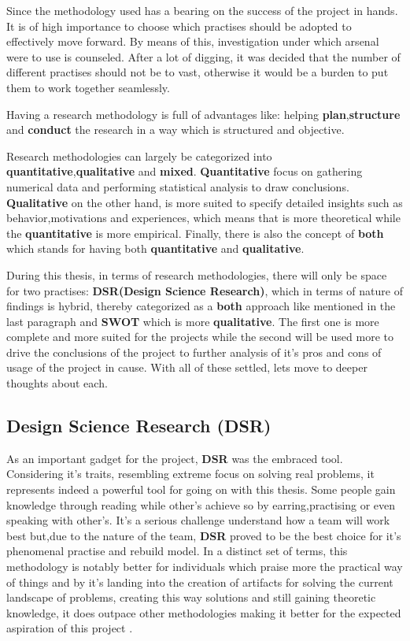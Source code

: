 Since the methodology used has a bearing on the success of the project in hands. It is of high importance to choose which
practises should be adopted to effectively move forward. By means of this, investigation under which arsenal were to use is
counseled. After a lot of digging, it was decided that the number of different practises should not be to vast, otherwise it 
would be a burden to put them to work together seamlessly. 

Having a research methodology is full of advantages like: helping \textbf{plan},\textbf{structure} and \textbf{conduct} 
the research in a way which is structured and objective. 

Research methodologies can largely be categorized into \textbf{quantitative},\textbf{qualitative} and \textbf{mixed}. 
\textbf{Quantitative} focus on gathering numerical data and performing statistical analysis to draw conclusions. \textbf{Qualitative} 
on the other hand, is more suited to specify detailed insights such as behavior,motivations and experiences, which means that is more 
theoretical while the \textbf{quantitative} is more empirical. Finally, there is also the concept of \textbf{both} which stands for having 
both \textbf{quantitative} and \textbf{qualitative}.

During this thesis, in terms of research methodologies, there will only be space for two practises:  \textbf{DSR(Design Science Research)}, 
which in terms of nature of findings is hybrid, thereby categorized as a \textbf{both} approach like mentioned in the last paragraph and 
\textbf{SWOT} which is more \textbf{qualitative}. The first one is more complete and more suited for the projects while the second will 
be used more to drive the conclusions of the project to further analysis of it's pros and cons of usage of the project in cause. With 
all of these settled, lets move to deeper thoughts about each.

%
%
%
%
\subsection{Design Science Research (DSR)}
As an important gadget for the project, \textbf{DSR}  was the embraced tool. Considering it's traits, resembling extreme focus
on solving real problems, it represents indeed a powerful tool for going on with this thesis. Some people gain knowledge through
reading while other's achieve so by earring,practising or even speaking with other's. It's a serious challenge understand how a 
team will work best but,due to the nature of the team, \textbf{DSR} proved to be the best choice for it's phenomenal practise and 
rebuild model. In a distinct set of terms, this methodology is notably better for individuals which praise more the practical way of
things and by it's landing into the creation of artifacts for solving the current landscape of problems, creating this way solutions
and still gaining theoretic knowledge, it does outpace other methodologies making it better for the expected aspiration of 
this project \cite{dsr-book}.

